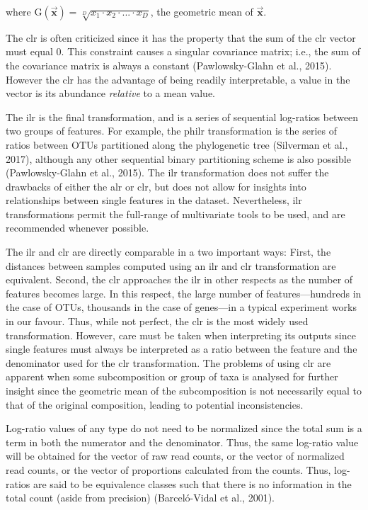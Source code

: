 \documentclass[twocolumn]{article}
\begin{document}
where
\(\mathrm{G}(\vec{\textbf{x}}) = \sqrt[D]{x_1 \cdot x_2 \cdot ... \cdot x_D}\),
the geometric mean of \(\vec{\textbf{x}}\).

The clr is often criticized since it has the property that the sum of
the clr vector must equal 0. This constraint causes a singular
covariance matrix; i.e., the sum of the covariance matrix is always a
constant (Pawlowsky-Glahn et al., 2015). However the clr has the
advantage of being readily interpretable, a value in the vector is its
abundance \emph{relative} to a mean value.

The ilr is the final transformation, and is a series of sequential
log-ratios between two groups of features. For example, the philr
transformation is the series of ratios between OTUs partitioned along
the phylogenetic tree (Silverman et al., 2017), although any other
sequential binary partitioning scheme is also possible (Pawlowsky-Glahn
et al., 2015). The ilr transformation does not suffer the drawbacks of
either the alr or clr, but does not allow for insights into
relationships between single features in the dataset. Nevertheless, ilr
transformations permit the full-range of multivariate tools to be used,
and are recommended whenever possible.

The ilr and clr are directly comparable in a two important ways: First,
the distances between samples computed using an ilr and clr
transformation are equivalent. Second, the clr approaches the ilr in
other respects as the number of features becomes large. In this respect,
the large number of features---hundreds in the case of OTUs, thousands
in the case of genes---in a typical experiment works in our favour.
Thus, while not perfect, the clr is the most widely used transformation.
However, care must be taken when interpreting its outputs since single
features must always be interpreted as a ratio between the feature and
the denominator used for the clr transformation. The problems of using
clr are apparent when some subcomposition or group of taxa is analysed
for further insight since the geometric mean of the subcomposition is
not necessarily equal to that of the original composition, leading to
potential inconsistencies.

Log-ratio values of any type do not need to be normalized since the
total sum is a term in both the numerator and the denominator. Thus, the
same log-ratio value will be obtained for the vector of raw read counts,
or the vector of normalized read counts, or the vector of proportions
calculated from the counts. Thus, log-ratios are said to be equivalence
classes such that there is no information in the total count (aside from
precision) (Barceló-Vidal et al., 2001).
\end{document}
